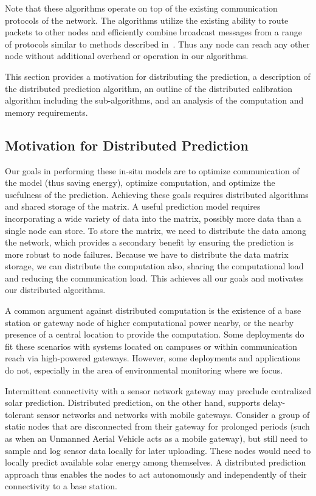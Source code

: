 \documentclass[prodmode,acmtosn]{acmsmall}
\begin{document}
Note that these algorithms operate on top of the existing communication protocols of the network.
The algorithms utilize the existing ability to route packets to other nodes and efficiently combine broadcast messages from a range of protocols similar to methods described in~\cite{HansenIPSN2011}.
Thus any node can reach any other node without additional overhead or operation in our algorithms.

This section provides a motivation for distributing the prediction, a description of the distributed prediction algorithm, an outline of the distributed calibration algorithm including the sub-algorithms, and an analysis of the computation and memory requirements.

\subsection{Motivation for Distributed Prediction}
Our goals in performing these in-situ models are to optimize communication of the model (thus saving energy), optimize computation, and optimize the usefulness of the prediction.
Achieving these goals requires distributed algorithms and shared storage of the matrix.
A useful prediction model requires incorporating a wide variety of data into the matrix, possibly more data than a single node can store.
To store the matrix, we need to distribute the data among the network, which provides a secondary benefit by ensuring the prediction is more robust to node failures.
Because we have to distribute the data matrix storage, we can distribute the computation also, sharing the computational load and reducing the communication load.
This achieves all our goals and motivates our distributed algorithms.

A common argument against distributed computation is the existence of a base station or gateway node of higher computational power nearby, or the nearby presence of a central location to provide the computation.
Some deployments do fit these scenarios with systems located on campuses or within communication reach via high-powered gateways.
However, some deployments and applications do not, especially in the area of environmental monitoring where we focus.

Intermittent connectivity with a sensor network gateway may preclude centralized solar prediction. Distributed prediction, on the other hand, supports delay-tolerant sensor networks and networks with mobile gateways. Consider a group of static nodes that are disconnected from their gateway for prolonged periods (such as when an Unmanned Aerial Vehicle acts as a mobile gateway), but still need to sample and log sensor data locally for later uploading. These nodes would need to locally predict available solar energy among themselves. A distributed prediction approach thus enables the nodes to act autonomously and independently of their connectivity to a base station. 
\end{document}
